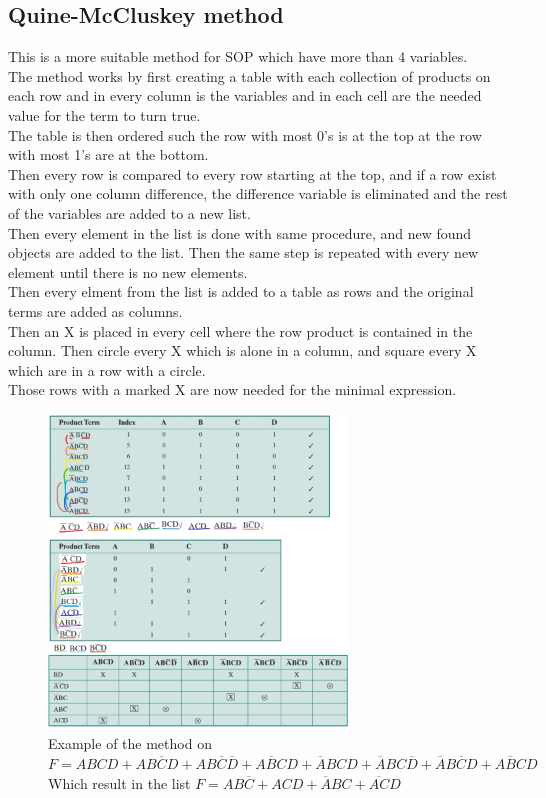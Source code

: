 \documentclass[12pt, a4paper]{article}
\begin{document}
			\subsection{Quine-McCluskey method}
				This is a more suitable method for SOP which have more than 4 variables.\\
				The method works by first creating a table with each collection of products on each row and in every column is the variables and in each cell are the needed value for the term to turn true.\\
				The table is then ordered such the row with most 0's is at the top at the row with most 1's are at the bottom.\\
				Then every row is compared to every row starting at the top, and if a row exist with only one column difference, the difference variable is eliminated and the rest of the variables are added to a new list.\\
				Then every element in the list is done with same procedure, and new found objects are added to the list. Then the same step is repeated with every new element until there is no new elements.\\
				Then every elment from the list is added to a table as rows and the original terms are added as columns.\\
				Then an X is placed in every cell where the row product is contained in the column. Then circle every X which is alone in a column, and square every X which are in a row with a circle.\\
				Those rows with a marked X are now needed for the minimal expression.
				\begin{figure}[h!]
					\includegraphics[width=300px]{assets/quine-McCluskey.png}
					\centering
					\caption{Example of the method on \\$F=ABCD+AB\overline{C}D+AB\overline{C}\overline{D}+A\overline{B}CD+\overline{A}BCD+\overline{A}BC\overline{D}+\overline{A}B\overline{C}D+\overline{ABC}D$\\
					Which result in the list $F=AB\overline{C}+ACD+\overline{A}BC+\overline{AC}D$}
				\end{figure}
\end{document}
